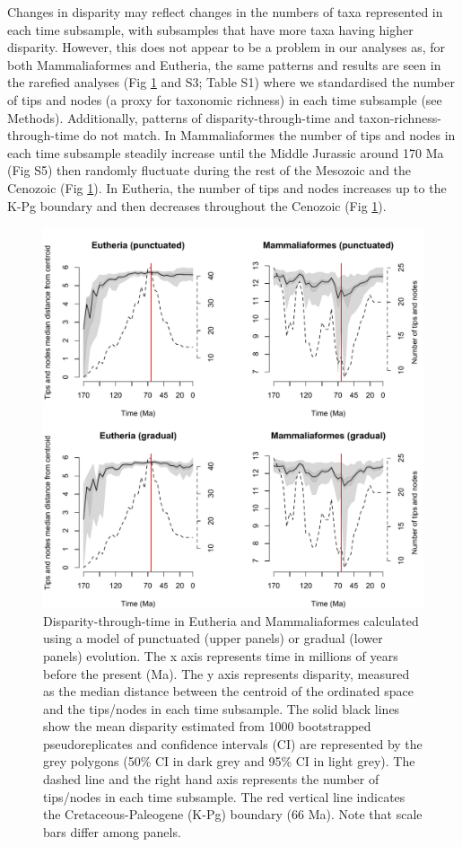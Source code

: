 \documentclass[12pt,letterpaper]{article}
\begin{document}
Changes in disparity may reflect changes in the numbers of taxa represented in each time subsample, with subsamples that have more taxa having higher disparity. 
However, this does not appear to be a problem in our analyses as, for both Mammaliaformes and Eutheria, the same patterns and results are seen in the rarefied analyses (Fig \ref{fig:Fig_Raw_results} and S3; Table S1) where we standardised the number of tips and nodes (a proxy for taxonomic richness) in each time subsample (see Methods).
Additionally, patterns of disparity-through-time and taxon-richness-through-time do not match.
In Mammaliaformes the number of tips and nodes in each time subsample steadily increase until the Middle Jurassic around 170 Ma (Fig S5) then randomly fluctuate during the rest of the Mesozoic and the Cenozoic (Fig \ref{fig:Fig_Raw_results}).
In Eutheria, the number of tips and nodes increases up to the K-Pg boundary and then decreases throughout the Cenozoic (Fig \ref{fig:Fig_Raw_results}).

\begin{figure}[!htbp]
\centering
    \includegraphics[keepaspectratio=true]{Figures/Main_results.pdf}
\caption{\scriptsize{Disparity-through-time in Eutheria and Mammaliaformes calculated using a model of punctuated (upper panels) or gradual (lower panels) evolution. The x axis represents time in millions of years before the present (Ma). The y axis represents disparity, measured as the median distance between the centroid of the ordinated space and the tips/nodes in each time subsample. The solid black lines show the mean disparity estimated from 1000 bootstrapped pseudoreplicates and confidence intervals (CI) are represented by the grey polygons (50\% CI in dark grey and 95\% CI in light grey). The dashed line and the right hand axis represents the number of tips/nodes in each time subsample. The red vertical line indicates the Cretaceous-Paleogene (K-Pg) boundary (66 Ma). Note that scale bars differ among panels.}}
\label{fig:Fig_Raw_results}
\end{figure}
\end{document}
